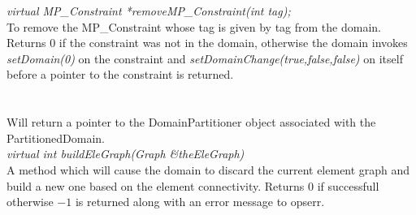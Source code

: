 {\em virtual MP\_Constraint *removeMP\_Constraint(int tag);} \\
To remove the MP\_Constraint whose tag is given by \p tag from the
domain. Returns $0$ if the constraint was not in the domain, otherwise
the domain invokes {\em setDomain(0)} on the constraint and {\em
setDomainChange(true,false,false)} on itself before a pointer to the
constraint is returned.\\  




  \\
 \\
Will return a pointer to the DomainPartitioner object associated with the
PartitionedDomain. \\

{\em virtual int buildEleGraph(Graph \&theEleGraph)} \\
A method which will cause the domain to discard the current element
graph and build a new one based on the element connectivity. Returns
$0$ if successfull otherwise $-1$ is returned along with an error
message to opserr. \\
